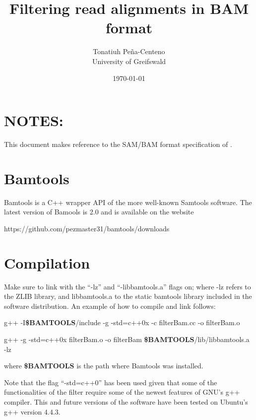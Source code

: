 \documentclass[11pt]{article}
\title{Filtering read alignments in BAM format}
\author{Tonatiuh Pe\~{n}a-Centeno \\
University of Greifswald}
\date{\today}
\begin{document}
  
\maketitle
{}

\section{NOTES:}  
This document makes reference to the SAM/BAM format specification of \citet{heng09:SAM}.

\section{Bamtools}
Bamtools is a C++ wrapper API of the more well-known Samtools software. The latest version of Bamools 
is 2.0 and is available on the website 
	\begin{center}
		https://github.com/pezmaster31/bamtools/downloads
	\end{center}
\item 


\section{Compilation}
Make sure to link with the ``-lz'' and ``-libbamtools.a'' flags on; where -lz refers to the ZLIB library, 
and libbamtools.a to the static bamtools library included in the software distribution. An example of 
how to compile and link follows: 

\begin{enumerate}
\begin{flushleft}
	\item	
		g++ -I\textbf{\$BAMTOOLS}/include   -g   -std=c++0x  -c filterBam.cc -o filterBam.o \\
	\item	g++     -g -std=c++0x  filterBam.o -o filterBam \textbf{\$BAMTOOLS}/lib/libbamtools.a -lz  
\end{flushleft}
\end{enumerate}
\vphantom{Nothing}
where \textbf{\$BAMTOOLS} is the path where Bamtools was installed.

Note that the flag ``-std=c++0'' has been used given that some of the functionalities of the filter require 
some of the newest features of GNU's g++ compiler. This and future versions of the software have been tested 
on Ubuntu's g++ version 4.4.3.
\end{document}
